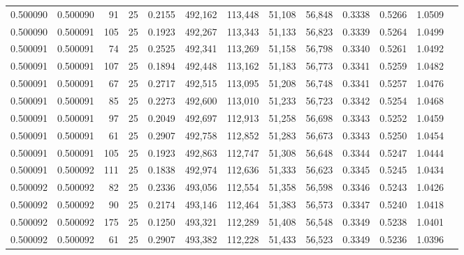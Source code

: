 \begin{tabular}{rrrrrrrrrrrrr}
0.500090 & 0.500090 &    91 &  25 &                                     0.2155 & 492,162 & 113,448 &  51,108 &  56,848 & 0.3338 & 0.5266 & 1.0509 \\
0.500090 & 0.500091 &   105 &  25 &                                     0.1923 & 492,267 & 113,343 &  51,133 &  56,823 & 0.3339 & 0.5264 & 1.0499 \\
0.500091 & 0.500091 &    74 &  25 &                                     0.2525 & 492,341 & 113,269 &  51,158 &  56,798 & 0.3340 & 0.5261 & 1.0492 \\
0.500091 & 0.500091 &   107 &  25 &                                     0.1894 & 492,448 & 113,162 &  51,183 &  56,773 & 0.3341 & 0.5259 & 1.0482 \\
0.500091 & 0.500091 &    67 &  25 &                                     0.2717 & 492,515 & 113,095 &  51,208 &  56,748 & 0.3341 & 0.5257 & 1.0476 \\
0.500091 & 0.500091 &    85 &  25 &                                     0.2273 & 492,600 & 113,010 &  51,233 &  56,723 & 0.3342 & 0.5254 & 1.0468 \\
0.500091 & 0.500091 &    97 &  25 &                                     0.2049 & 492,697 & 112,913 &  51,258 &  56,698 & 0.3343 & 0.5252 & 1.0459 \\
0.500091 & 0.500091 &    61 &  25 &                                     0.2907 & 492,758 & 112,852 &  51,283 &  56,673 & 0.3343 & 0.5250 & 1.0454 \\
0.500091 & 0.500091 &   105 &  25 &                                     0.1923 & 492,863 & 112,747 &  51,308 &  56,648 & 0.3344 & 0.5247 & 1.0444 \\
0.500091 & 0.500092 &   111 &  25 &                                     0.1838 & 492,974 & 112,636 &  51,333 &  56,623 & 0.3345 & 0.5245 & 1.0434 \\
0.500092 & 0.500092 &    82 &  25 &                                     0.2336 & 493,056 & 112,554 &  51,358 &  56,598 & 0.3346 & 0.5243 & 1.0426 \\
0.500092 & 0.500092 &    90 &  25 &                                     0.2174 & 493,146 & 112,464 &  51,383 &  56,573 & 0.3347 & 0.5240 & 1.0418 \\
0.500092 & 0.500092 &   175 &  25 &                                     0.1250 & 493,321 & 112,289 &  51,408 &  56,548 & 0.3349 & 0.5238 & 1.0401 \\
0.500092 & 0.500092 &    61 &  25 &                                     0.2907 & 493,382 & 112,228 &  51,433 &  56,523 & 0.3349 & 0.5236 & 1.0396 \\

\end{tabular}
